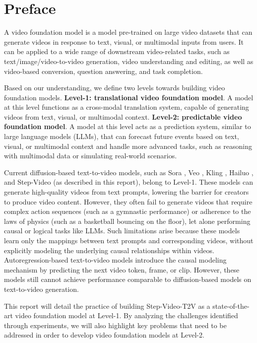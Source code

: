 
\section{Preface}

A video foundation model is a model pre-trained on large video datasets that can generate videos in response to text, visual, or multimodal inputs from users. It can be applied to a wide range of downstream video-related tasks, such as text/image/video-to-video generation, video understanding and editing, as well as video-based conversion, question answering, and task completion.

Based on our understanding, we define two levels towards building video foundation models. 
\textbf{Level-1: translational video foundation model}. A model at this level functions as a cross-modal translation system, capable of generating videos from text, visual, or multimodal context.
\textbf{Level-2: predictable video foundation model}. A model at this level acts as a prediction system, similar to large language models (LLMs), that can forecast future events based on text, visual, or multimodal context and handle more advanced tasks, such as reasoning with multimodal data or simulating real-world scenarios.

Current diffusion-based text-to-video models, such as Sora \cite{openaisora}, Veo \cite{veo}, Kling \cite{kling}, Hailuo \cite{hailuo}, and Step-Video (as described in this report), belong to Level-1. These models can generate high-quality videos from text prompts, lowering the barrier for creators to produce video content. However, they often fail to generate videos that require complex action sequences (such as a gymnastic performance) or adherence to the laws of physics (such as a basketball bouncing on the floor), let alone performing causal or logical tasks like LLMs. Such limitations arise because these models learn only the mappings between text prompts and corresponding videos, without explicitly modeling the underlying causal relationships within videos. Autoregression-based text-to-video models introduce the causal modeling mechanism by predicting the next video token, frame, or clip. However, these models still cannot achieve performance comparable to diffusion-based models on text-to-video generation.

This report will detail the practice of building Step-Video-T2V as a state-of-the-art video foundation model at Level-1. By analyzing the challenges identified through experiments, we will also highlight key problems that need to be addressed in order to develop video foundation models at Level-2.